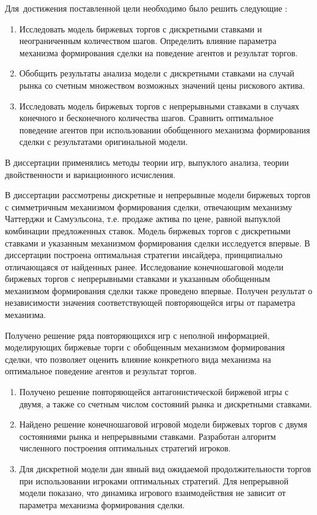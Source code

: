 Для~достижения поставленной цели необходимо было решить следующие {\tasks}:
\begin{enumerate}
\item 
Исследовать модель биржевых торгов с дискретными ставками и неограниченным количеством шагов.
Определить влияние параметра механизма формирования сделки на поведение агентов и результат торгов.
\item 
Обобщить результаты анализа модели с дискретными ставками на случай рынка со счетным множеством возможных значений цены рискового актива.
\item 
Исследовать модель биржевых торгов с непрерывными ставками в случаях конечного и бесконечного количества шагов.
Сравнить оптимальное поведение агентов при использовании обобщенного механизма формирования сделки с результатами оригинальной модели.
\end{enumerate}

{\methods} В диссертации применялись методы теории игр, выпуклого анализа, теории двойственности и вариационного исчисления.

{\novelty}
В диссертации рассмотрены дискретные и непрерывные модели биржевых торгов с симметричным механизмом формирования сделки, отвечающим механизму Чаттерджи и Самуэльсона, т.е. продаже актива по цене, равной выпуклой комбинации предложенных ставок.
Модель биржевых торгов с дискретными ставками и указанным механизмом формирования сделки исследуется впервые.
В диссертации построена оптимальная стратегии инсайдера, принципиально отличающаяся от найденных ранее.
Исследование конечношаговой модели биржевых торгов с непрерывными ставками и указанным обобщенным механизмом формирования сделки также проведено впервые.
Получен результат о независимости значения соответствующей повторяющейся игры от параметра механизма.

{\influence} Получено решение ряда повторяющихся игр с неполной информацией, моделирующих биржевые торги с обобщенным механизмом формирования сделки, что позволяет оценить влияние конкретного вида механизма на оптимальное поведение агентов и результат торгов.

{}
\begin{enumerate}
\item
  Получено решение повторяющейся антагонистической биржевой игры с двумя, а также со счетным числом состояний рынка и дискретными ставками.
\item
  Найдено решение конечношаговой игровой модели биржевых торгов с двумя состояниями рынка и непрерывными ставками.
  Разработан алгоритм численного построения оптимальных стратегий игроков.
\item
  Для дискретной модели дан явный вид ожидаемой продолжительности торгов при использовании игроками оптимальных стратегий.
  Для непрерывной модели показано, что динамика игрового взаимодействия не зависит от параметра механизма формирования сделки.
\end{enumerate}

